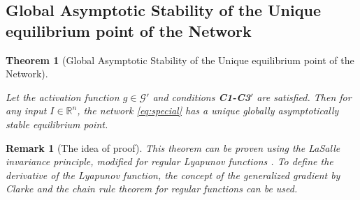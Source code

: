 \documentclass[journal]{IEEEtran}
\newtheorem{theorem}{Theorem}
\newtheorem{remark}{Remark}
\begin{document}
\subsection{Global Asymptotic Stability of the Unique equilibrium point of the Network}
\begin{theorem}[Global Asymptotic Stability of the Unique equilibrium point of the Network]\label{main}


Let the activation function $g\in \mathcal{G'}$ and conditions \textbf{C1-C3$'$} are satisfied. Then for any input $I\in \mathbb{R}^n$, the network \eqref{eq:special} has a unique globally asymptotically stable equilibrium point.

\end{theorem}

\begin{remark}[The idea of proof] This theorem can be proven using the LaSalle invariance principle, modified for regular Lyapunov functions \cite{p9}. To define the derivative of the Lyapunov function, the concept of the generalized gradient by Clarke and the chain rule theorem for regular functions can be used.
\end{remark}
\end{document}
